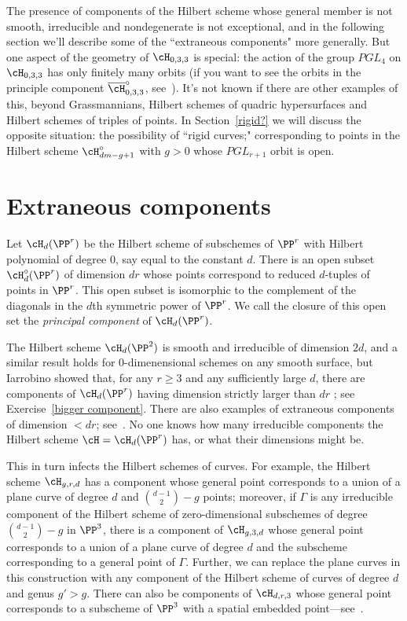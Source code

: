 The presence of components of the Hilbert scheme whose general member is not smooth, irreducible and nondegenerate is not exceptional, and in the following section we'll describe some of the ``extraneous components" more generally. But one aspect of the geometry of $\cH_{0,3,3}$ is special: the action of the group $PGL_4$ on $\cH_{0,3,3}$ has only finitely many orbits (if you want to see the orbits in the principle component $\overline{\cH}^\circ_{0,3,3}$, see~\cite{Montreal}). It's not known if there are other examples of this, beyond Grassmannians, Hilbert schemes of quadric hypersurfaces and Hilbert schemes of triples of points.  In Section~\ref{rigid?} we will discuss the opposite situation: the possibility of ``rigid curves;"  corresponding to points in the Hilbert scheme $\cH^{\circ}_{dm-g+1}$ with $g>0$ whose $PGL_{r+1}$ orbit is open.

\section{Extraneous components}

 Let $\cH_d(\PP^r)$ be the Hilbert scheme of subschemes of $\PP^r$ with Hilbert polynomial of degree 0, say equal to the constant $d$. There is an open subset $\cH^\circ_d(\PP^r)$ of dimension $dr$ whose points correspond to reduced $d$-tuples of points in $\PP^r$. This open subset is isomorphic to the complement of the diagonals in the $d$th symmetric power of $\PP^r$. We call the closure of this open set the \emph{principal component} of $\cH_d(\PP^r)$. 
 
The Hilbert scheme  $\cH_d(\PP^2)$ is smooth and irreducible of dimension $2d$, and a similar result holds for 
0-dimenensional schemes on any smooth surface, but Iarrobino showed that, for any $r \geq 3$ and any sufficiently large $d$, there are components of $\cH_d(\PP^r)$ having dimension strictly larger than $dr$ \cite{Iarrobino1985}; see Exercise~\ref{bigger component}. There are also examples of extraneous components
of dimension $<dr$; see~\cite{MR2579394}. No one knows how many irreducible components the Hilbert scheme $\cH = \cH_d(\PP^r)$ has, or what their dimensions might be.

This in turn infects the Hilbert schemes of curves. For example, the Hilbert scheme $\cH_{g,r,d}$ has a component whose general point corresponds to a union of a plane curve of degree $d$ and $\binom{d-1}{2} - g$ points; moreover, if $\Gamma$ is any irreducible component of the Hilbert scheme of zero-dimensional subschemes of degree $\binom{d-1}{2} - g$ in $\PP^3$, there is a component of $\cH_{g,3,d}$ whose  general point corresponds to a union of a plane curve of degree $d$ and the subscheme corresponding to a general point of $\Gamma$. Further, we can replace the plane curves in this construction with any component of the Hilbert scheme of curves of degree $d$ and genus $g' > g$. There can also be components of $\cH_{d,r,3}$ whose general point corresponds to a subscheme of $\PP^3$ with a spatial embedded point---see~\cite{Chen-Nollet}.


